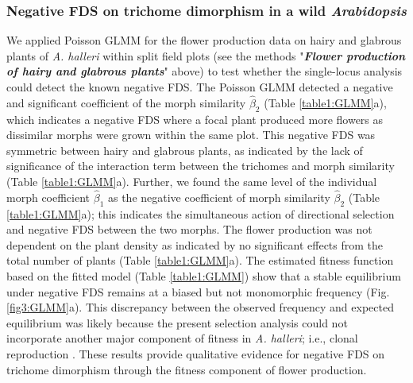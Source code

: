 \documentclass[12pt,]{article}
\begin{document}
\subsubsection{Negative FDS on trichome dimorphism in a wild \textit{Arabidopsis}}
We applied Poisson GLMM for the flower production data on hairy and glabrous plants of \textit{A. halleri} within split field plots (see the methods "\textit{\textbf{Flower production of hairy and glabrous plants}}" above) to test whether the single-locus analysis could detect the known negative FDS. The Poisson GLMM detected a negative and significant coefficient of the morph similarity $\hat{\beta}_2$ (Table \ref{table1:GLMM}a), which indicates a negative FDS where a focal plant produced more flowers as dissimilar morphs were grown within the same plot. This negative FDS was symmetric between hairy and glabrous plants, as indicated by the lack of significance of the interaction term between the trichomes and morph similarity (Table \ref{table1:GLMM}a). Further, we found the same level of the individual morph coefficient $\hat{\beta}_1$ as the negative coefficient of morph similarity $\hat{\beta}_2$ (Table \ref{table1:GLMM}a); this indicates the simultaneous action of directional selection and negative FDS between the two morphs. The flower production was not dependent on the plant density as indicated by no significant effects from the total number of plants (Table \ref{table1:GLMM}a). The estimated fitness function based on the fitted model (Table \ref{table1:GLMM}) show that a stable equilibrium under negative FDS remains at a biased but not monomorphic frequency (Fig. \ref{fig3:GLMM}a). This discrepancy between the observed frequency and expected equilibrium was likely because the present selection analysis could not incorporate another major component of fitness in \textit{A. halleri}; i.e., clonal reproduction \citep{sato2017herbivore}. These results provide qualitative evidence for negative FDS on trichome dimorphism through the fitness component of flower production.
\end{document}
